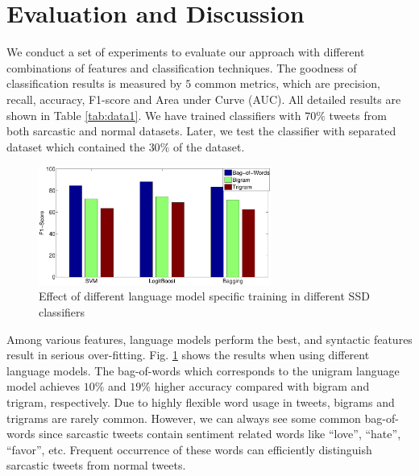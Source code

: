 \section{Evaluation and Discussion}
\label{sec:evaluation}

We conduct a set of experiments to evaluate our approach with different combinations of features and classification techniques. The goodness of classification results is measured by $5$ common metrics, which are precision, recall, accuracy, F1-score and Area under Curve (AUC). All detailed results are shown in Table \ref{tab:data1}. We have trained classifiers with $70\%$ tweets from both sarcastic and normal datasets. Later, we test the classifier with separated dataset which contained the $30\%$ of the dataset.\\

\begin{figure}[hbt]
\centering
\includegraphics[width=3in, height= 2.4 in]{./figs/bow.eps}
\caption{Effect of different language model specific training in different SSD classifiers}
\label{train:fig}
\end{figure}

Among various features, language models perform the best, and syntactic features result in serious over-fitting. Fig. \ref{train:fig} shows the results when using different language models. The bag-of-words which corresponds to the unigram language model achieves $10\%$ and $19\%$ higher accuracy compared with bigram and trigram, respectively. Due to highly flexible word usage in tweets, bigrams and trigrams are rarely common. However, we can always see some common bag-of-words since sarcastic tweets contain sentiment related words like ``love'', ``hate'', ``favor'', etc. Frequent occurrence of these words can efficiently distinguish sarcastic tweets from normal tweets.\\

